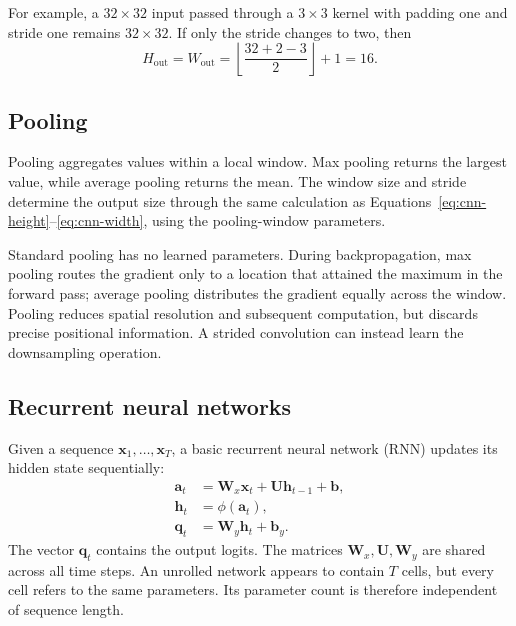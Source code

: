 For example, a \(32\times32\) input passed through a \(3\times3\) kernel with padding one and stride one remains \(32\times32\). If only the stride changes to two, then
\[
    H_{\mathrm{out}}
    =W_{\mathrm{out}}
    =\left\lfloor\frac{32+2-3}{2}\right\rfloor+1
    =16.
\]

\ConvolutionGeometryFigure

\subsection{Pooling}

Pooling aggregates values within a local window. Max pooling returns the largest value, while average pooling returns the mean. The window size and stride determine the output size through the same calculation as Equations~\eqref{eq:cnn-height}--\eqref{eq:cnn-width}, using the pooling-window parameters.

Standard pooling has no learned parameters. During backpropagation, max pooling routes the gradient only to a location that attained the maximum in the forward pass; average pooling distributes the gradient equally across the window. Pooling reduces spatial resolution and subsequent computation, but discards precise positional information. A strided convolution can instead learn the downsampling operation.

\subsection{Recurrent neural networks}

Given a sequence \(\mathbf{x}_1,\ldots,\mathbf{x}_T\), a basic recurrent neural network (RNN) updates its hidden state sequentially:
\begin{align}
    \mathbf{a}_t
    &=\mathbf{W}_x\mathbf{x}_t
      +\mathbf{U}\mathbf{h}_{t-1}
      +\mathbf{b},
    \label{eq:rnn-preactivation}\\
    \mathbf{h}_t
    &=\phi(\mathbf{a}_t),
    \label{eq:rnn-state}\\
    \mathbf{q}_t
    &=\mathbf{W}_y\mathbf{h}_t+\mathbf{b}_y.
    \label{eq:rnn-output}
\end{align}
The vector $\mathbf q_t$ contains the output logits. The matrices \(\mathbf{W}_x,\mathbf{U},\mathbf{W}_y\) are shared across all time steps. An unrolled network appears to contain \(T\) cells, but every cell refers to the same parameters. Its parameter count is therefore independent of sequence length.

